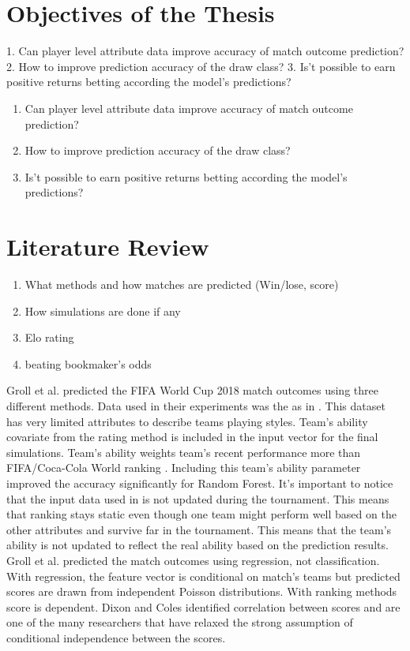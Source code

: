 \section{Objectives of the Thesis}
1. Can player level attribute data improve accuracy of match outcome prediction?
2. How to improve prediction accuracy of the draw class?
3. Is't possible to earn positive returns betting according the model's predictions?
\begin{enumerate}
    \item Can player level attribute data improve accuracy of match outcome prediction?
    \item How to improve prediction accuracy of the draw class?
    \item Is't possible to earn positive returns betting according the model's predictions?
\end{enumerate}
\section{Literature Review}

\begin{enumerate}
    \item What methods and how matches are predicted (Win/lose, score)
    \item How simulations are done if any
    \item Elo rating
    \item beating bookmaker's odds
\end{enumerate}

Groll et al. \cite{groll2018prediction} predicted the FIFA World Cup 2018 match outcomes using three different methods. Data used in their experiments was the as in \cite{groll2015prediction}. This dataset has very limited attributes to describe teams playing styles. Team's ability covariate from the rating method is included in the input vector for the final simulations. Team's ability weights team's recent performance more than FIFA/Coca-Cola World ranking . Including this team's ability parameter improved the accuracy significantly for Random Forest. It's important to notice that the input data used in \cite{groll2018prediction} is not updated during the tournament. This means that ranking stays static even though one team might perform well based on the other attributes and survive far in the tournament. This means that the team's ability is not updated to reflect the real ability based on the prediction results.
Groll et al. \cite{groll2018prediction} predicted the match outcomes using regression, not classification. With regression, the feature vector is conditional on match's teams but predicted scores are drawn from independent Poisson distributions. With ranking methods score is dependent. Dixon and Coles \cite{dixon1997} identified correlation between scores and are one of the many researchers that have relaxed the strong assumption of conditional independence between the scores.

